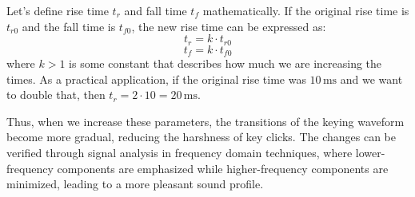 Let's define rise time \( t_r \) and fall time \( t_f \) mathematically. If the original rise time is \( t_{r0} \) and the fall time is \( t_{f0} \), the new rise time can be expressed as:
\[
t_{r} = k \cdot t_{r0}
\]
\[
t_{f} = k \cdot t_{f0}
\]
where \( k > 1 \) is some constant that describes how much we are increasing the times. As a practical application, if the original rise time was \( 10 \, \text{ms} \) and we want to double that, then \( t_{r} = 2 \cdot 10 = 20 \, \text{ms} \).

Thus, when we increase these parameters, the transitions of the keying waveform become more gradual, reducing the harshness of key clicks. The changes can be verified through signal analysis in frequency domain techniques, where lower-frequency components are emphasized while higher-frequency components are minimized, leading to a more pleasant sound profile.

